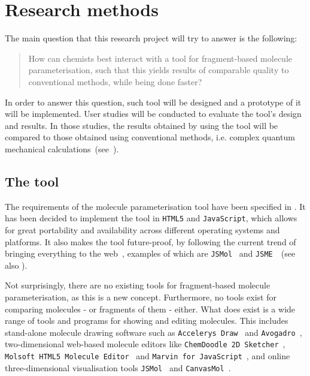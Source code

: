 \chapter{Research methods}

The main question that this research project will try to answer is the following:
\begin{quote}
How can chemists best interact with a tool for fragment-based molecule parameterisation, such that this yields results of comparable quality to conventional methods, while being done faster?
\end{quote}
In order to answer this question, such tool will be designed and a prototype of it will be implemented. User studies will be conducted to evaluate the tool's design and results. In those studies, the results obtained by using the tool will be compared to those obtained using conventional methods, i.e. complex quantum mechanical calculations~(see~).


\section{The tool}

The requirements of the molecule parameterisation tool have been specified in . It has been decided to implement the tool in \verb|HTML5| and \verb|JavaScript|, which allows for great portability and availability across different operating systems and platforms. It also makes the tool future-proof, by following the current trend of bringing everything to the web~\cite{ertl2010molecular}, examples of which are \verb|JSMol|~\cite{hanson2013jsmol} and \verb|JSME|~\cite{bienfait2013jsme}~(see also ).

Not surprisingly, there are no existing tools for fragment-based molecule parameterisation, as this is a new concept. Furthermore, no tools exist for comparing molecules - or fragments of them - either. What does exist is a wide range of tools and programs for showing and editing molecules. This includes stand-alone molecule drawing software such as \verb|Accelerys Draw|~\cite{accelrys2012accelrys} and \verb|Avogadro|~\cite{hanwell2012avogadro}, two-dimensional web-based molecule editors like \verb|ChemDoodle 2D Sketcher|~\cite{ichemlabs2013chemdoodle}, \verb|Molsoft HTML5 Molecule Editor|~\cite{molsoft2012molsoft} and \verb|Marvin for JavaScript|~\cite{chemxon2013marvin}, and online three-dimensional visualisation tools \verb|JSMol|~\cite{hanson2013jsmol} and \verb|CanvasMol|~\cite{altered2013canvasmol}.

